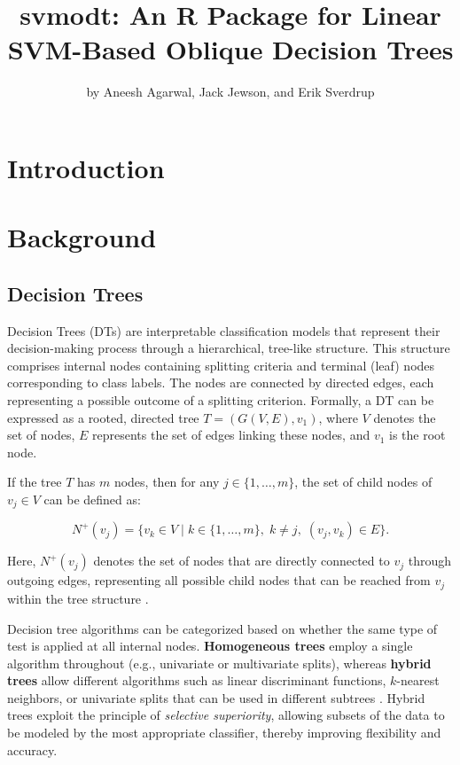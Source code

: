 \title{svmodt: An R Package for Linear SVM-Based Oblique Decision Trees}


\author{by Aneesh Agarwal, Jack Jewson, and Erik Sverdrup}

\maketitle


\section{Introduction}\label{introduction}

\section{Background}\label{background}

\subsection{Decision Trees}\label{decision-trees}

Decision Trees (DTs) are interpretable classification models that represent their decision-making process through a hierarchical, tree-like structure. This structure comprises internal nodes containing splitting criteria and terminal (leaf) nodes corresponding to class labels. The nodes are connected by directed edges, each representing a possible outcome of a splitting criterion. Formally, a DT can be expressed as a rooted, directed tree \(T = (G(V, E), v_1)\), where \(V\) denotes the set of nodes, \(E\) represents the set of edges linking these nodes, and \(v_1\) is the root node.

If the tree \(T\) has \(m\) nodes, then for any \(j \in \{1, \ldots, m\}\), the set of child nodes of \(v_j \in V\) can be defined as:

\[
N^{+}(v_j) = \{ v_k \in V \mid k \in \{1, \ldots, m\},\; k \neq j,\; (v_j, v_k) \in E \}.
\]

Here, \(N^{+}(v_j)\) denotes the set of nodes that are directly connected to \(v_j\) through outgoing edges, representing all possible child nodes that can be reached from \(v_j\) within the tree structure \citep{lopez2018}.

Decision tree algorithms can be categorized based on whether the same type of test is applied at all internal nodes. \textbf{Homogeneous trees} employ a single algorithm throughout (e.g., univariate or multivariate splits), whereas \textbf{hybrid trees} allow different algorithms such as linear discriminant functions, \(k\)-nearest neighbors, or univariate splits that can be used in different subtrees \citep{brodley1995}. Hybrid trees exploit the principle of \emph{selective superiority}, allowing subsets of the data to be modeled by the most appropriate classifier, thereby improving flexibility and accuracy.

